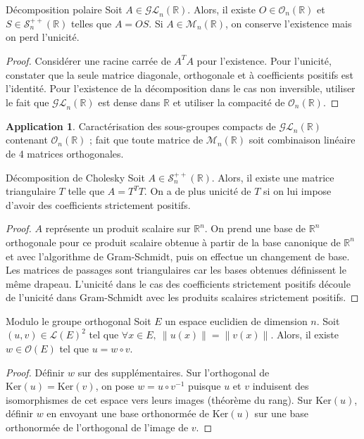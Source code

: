 \documentclass[french]{article}
\newcommand{\R}{\mathbb{R}}
\newcommand{\inv}{^{-1}}
\renewcommand{\ker}{\text{Ker}}
\theoremstyle{definition}
\newtheorem*{app}{Application}
\begin{document}
\begin{lem}{Décomposition polaire}
	Soit $A\in\mathcal{GL}_n(\R)$. Alors, il existe $O\in\mathcal{O}_n(\R)$ et $S\in\mathcal{S}_n^{++}(\R)$ telles que $A=OS$. Si $A\in\mathcal{M}_n(\R)$, on conserve l'existence mais on perd l'unicité.
\end{lem}
\begin{proof}
	Considérer une racine carrée de $A^TA$ pour l'existence. Pour l'unicité, constater que la seule matrice diagonale, orthogonale et à coefficients positifs est l'identité. Pour l'existence de la décomposition dans le cas non inversible, utiliser le fait que $\mathcal{GL}_n(\R)$ est dense dans $\R$ et utiliser la compacité de $\mathcal{O}_n(\R)$.
\end{proof}
\begin{app}
	Caractérisation des sous-groupes compacts de $\mathcal{GL}_n(\R)$ contenant $\mathcal{O}_n(\R)$ ; fait que toute matrice de $\mathcal{M}_n(\R)$ soit combinaison linéaire de 4 matrices orthogonales.
\end{app}

\begin{lem}{Décomposition de Cholesky}
	Soit $A\in\mathcal{S}_n^{++}(\R)$. Alors, il existe une matrice triangulaire $T$ telle que $A=T^TT$. On a de plus unicité de $T$ si on lui impose d'avoir des coefficients strictement positifs. 
\end{lem}
\begin{proof}
	$A$ représente un produit scalaire sur $\R^n$. On prend une base de $\R^n$ orthogonale pour ce produit scalaire obtenue à partir de la base canonique de $\R^n$ et avec l'algorithme de Gram-Schmidt, puis on effectue un changement de base. Les matrices de passages sont triangulaires car les bases obtenues définissent le même drapeau. L'unicité dans le cas des coefficients strictement positifs découle de l'unicité dans Gram-Schmidt avec les produits scalaires strictement positifs.
\end{proof}

\begin{lem}{Modulo le groupe orthogonal}
	Soit $E$ un espace euclidien de dimension $n$. Soit $(u,v)\in\mathcal{L}(E)^2$ tel que $\forall x\in E,\ \lVert u(x)\rVert=\lVert v(x)\rVert$. Alors, il existe $w\in\mathcal{O}(E)$ tel que $u=w\circ v$.
\end{lem}
\begin{proof}
	Définir $w$ sur des supplémentaires. Sur l'orthogonal de $\ker(u)=\ker(v)$, on pose $w=u\circ v\inv$ puisque $u$ et $v$ induisent des isomorphismes de cet espace vers leurs images (théorème du rang). Sur $\ker(u)$, définir $w$ en envoyant une base orthonormée de $\ker(u)$ sur une base orthonormée de l'orthogonal de l'image de $v$.
\end{proof}
\end{document}
